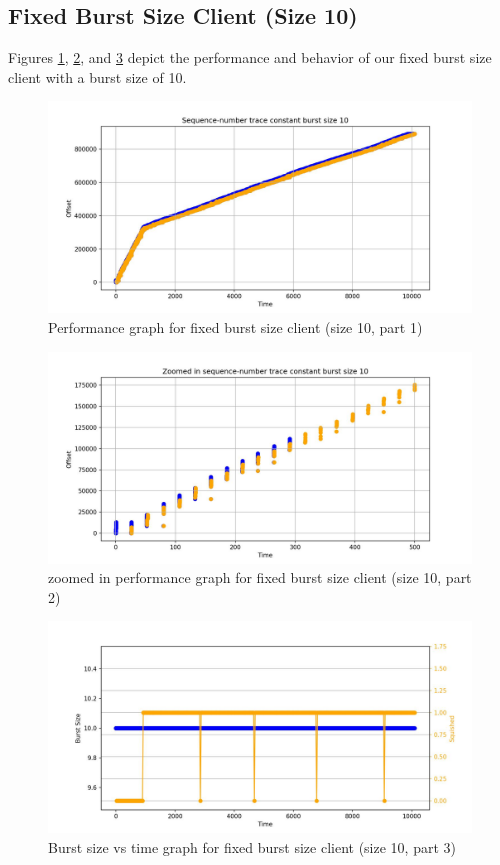 \documentclass[12pt]{article}
\begin{document}
\clearpage
\subsection{Fixed Burst Size Client (Size 10)}

Figures \ref{fig:fixed10_1}, \ref{fig:fixed10_2}, and \ref{fig:fixed10_3} depict the performance and behavior of our fixed burst size client with a burst size of 10.

\begin{figure}[h]
    \centering
    \includegraphics[width=0.7\linewidth]{constant burst size 10_1.jpeg}
    \caption{Performance graph for fixed burst size client (size 10, part 1)}
    \label{fig:fixed10_1}
\end{figure}

\begin{figure}[h]
    \centering
    \includegraphics[width=0.7\linewidth]{constant burst size 10_2.jpeg}
    \caption{zoomed in performance graph for fixed burst size client (size 10, part 2)}
    \label{fig:fixed10_2}
\end{figure}

\begin{figure}[h]
    \centering
    \includegraphics[width=0.7\linewidth]{constant burst size 10_3.jpeg}
    \caption{Burst size vs time graph for fixed burst size client (size 10, part 3)}
    \label{fig:fixed10_3}
\end{figure}
\end{document}
